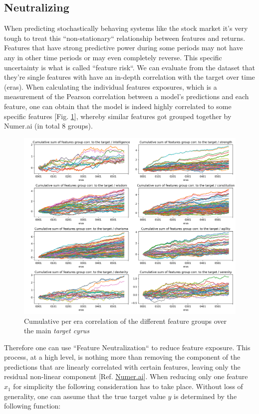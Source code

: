 \documentclass[12pt, a4paper]{article}
\begin{document}
\subsection{Neutralizing}
\label{sec: neutralizing}
When predicting stochastically behaving systems like the stock market it's very tough to treat this ``non-stationary`` relationship between features and returns. Features that have strong predictive power during some periods may not have any in other time periods or may even completely reverse. This specific uncertainty is what is called ``feature risk``. We can evaluate from the dataset that they're single features with have an in-depth correlation with the target over time (eras). When calculating the individual features exposures, which is a measurement of the Pearson correlation between a model's predictions and each feature, one can obtain that the model is indeed highly correlated to some specific features [Fig. \ref{fig: per_era_correlation}], whereby similar features got grouped together by Numer.ai (in total 8 groups). 
\begin{figure}[!htpb]
    \centering
    \includegraphics[width=1\textwidth,trim={0 0 0 0},clip]{figures/per_era_correlations.png}
    \caption[Cumulative per era correlation of the different feature groups]{Cumulative per era correlation of the different feature groups over the main \textit{target cyrus}}
    \label{fig: per_era_correlation}    
\end{figure}
Therefore one can use ``Feature Neutralization`` to reduce feature exposure. This process, at a high level, is nothing more than removing the component of the predictions that are linearly correlated with certain features, leaving only the residual non-linear component [Ref. \href{https://forum.numer.ai/t/an-introduction-to-feature-neutralization-exposure/4955}{Numer.ai}]. When reducing only one feature $x_1$ for simplicity the following consideration has to take place. Without loss of generality, one can assume that the true target value $y$ is determined by the following function:
\end{document}
